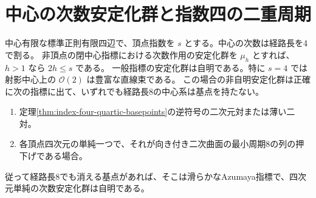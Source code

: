 \section{中心の次数安定化群と指数四の二重周期}
\label{sec:central-character-periods}
\begin{theorem}\label{thm:central-character-periods}
中心有限な標準正則有限四辺で、頂点指数を $s$ とする。中心の次数は経路長を4で割る。
非頂点の閉中心指標における次数作用の安定化群を $\mu_h$ とすれば、$h>1$ なら $2h\le s$ である。
一般指標の安定化群は自明である。特に $s=4$ では射影中心上の $\mathcal O(2)$ は豊富な直線束である。
この場合の非自明安定化群は正確に次の指標に出て、いずれでも経路長8の中心系は基点を持たない。
\begin{enumerate}
\item 定理\ref{thm:index-four-quartic-basepoints}の逆符号の二次元対または薄い二対。
\item 各頂点四次元の単純一つで、それが向き付き二次曲面の最小周期8の列の押下げである場合。
\end{enumerate}
従って経路長8でも消える基点があれば、そこは滑らかなAzumaya指標で、四次元単純の次数安定化群は自明である。
\end{theorem}
